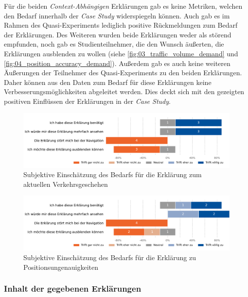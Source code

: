 Für die beiden \textit{Context-Abhängigen} Erklärungen gab es keine Metriken, welchen den Bedarf innerhalb der \textit{Case Study} widerspiegeln können. Auch gab es im Rahmen des Quasi-Experiments lediglich positive Rückmeldungen zum Bedarf der Erklärungen. Des Weiteren wurden beide Erklärungen weder als störend empfunden, noch gab es Studienteilnehmer, die den Wunsch äußerten, die Erklärungen ausblenden zu wollen (siehe \autoref{fig:03_traffic_volume_demand} und \autoref{fig:04_position_accuracy_demand}). Außerdem gab es auch keine weiteren Äußerungen der Teilnehmer des Quasi-Experiments zu den beiden Erklärungen. Daher können aus den Daten zum Bedarf für diese Erklärungen keine Verbesserungsmöglichkeiten abgeleitet werden. Dies deckt sich mit den gezeigten positiven Einflüssen der Erklärungen in der \textit{Case Study}.

\begin{figure}[htb!]
    \centering
    \includegraphics[width=\textwidth]{contents/06_model_evaluation/02_evaluation/res/qualitativeFeedback-03_traffic_volume_demand.pdf}
    \caption{Subjektive Einschätzung des Bedarfs für die Erklärung zum aktuellen Verkehrsgeschehen}
    \label{fig:03_traffic_volume_demand}
\end{figure}

\begin{figure}[htb!]
    \centering
    \includegraphics[width=\textwidth]{contents/06_model_evaluation/02_evaluation/res/qualitativeFeedback-04_position_accuracy_demand.pdf}
    \caption{Subjektive Einschätzung des Bedarfs für die Erklärung zu Positionsungenauigkeiten}
    \label{fig:04_position_accuracy_demand}
\end{figure}

\subsubsection{Inhalt der gegebenen Erklärungen}

